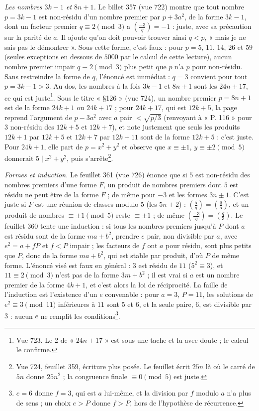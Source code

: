 \documentclass[11pt,a4paper]{article}
\begin{document}
\emph{Les nombres $3k-1$ et $8n+1$.} Le billet 357 (vue 722) montre que tout nombre $p=3k-1$ est non-résidu d'un nombre premier par $p+3a^2$, de la forme $3k-1$, dont un facteur premier $q\equiv 2\pmod 3$ a $\left(\frac{-3}{q}\right)=-1$ : juste, avec sa précaution sur la parité de $a$. Il ajoute qu'on doit pouvoir trouver ainsi $q<p$, « mais je ne sais pas le démontrer ». Sous cette forme, c'est faux : pour $p=5$, $11$, $14$, $26$ et $59$ (seules exceptions en dessous de $5000$ par le calcul de cette lecture), aucun nombre premier impair $q\equiv 2\pmod 3$ plus petit que $p$ n'a $p$ pour non-résidu. Sans restreindre la forme de $q$, l'énoncé est immédiat : $q=3$ convient pour tout $p=3k-1>3$. Au dos, les nombres à la fois $3k-1$ et $8n+1$ sont les $24n+17$, ce qui est juste\footnote{Vue 723. Le 2 de « $24n+17$ » est sous une tache et lu avec doute ; le calcul le confirme.}. Sous le titre « §126 » (vue 724), un nombre premier $p=8n+1$ est de la forme $24k+1$ ou $24k+17$ ; pour $24k+17$, qui est $12k+5$, la page reprend l'argument de $p-3a^2$ avec $a$ pair $<\sqrt{p/3}$ (renvoyant à « P. 116 » pour $3$ non-résidu des $12k+5$ et $12k+7$), et note justement que seuls les produits $12k+1$ par $12k+5$ et $12k+7$ par $12k+11$ sont de la forme $12k+5$ : c'est juste. Pour $24k+1$, elle part de $p=x^2+y^2$ et observe que $x\equiv\pm1$, $y\equiv\pm2\pmod 5$ donnerait $5\mid x^2+y^2$, puis s'arrête\footnote{Vue 724, feuillet 359, écriture plus posée. Le feuillet écrit $25n$ là où le carré de $5n$ donne $25n^2$ ; la congruence finale $\equiv 0\pmod 5$ est juste.}.

\emph{Formes et induction.} Le feuillet 361 (vue 726) énonce que si $5$ est non-résidu des nombres premiers d'une forme $F$, un produit de nombres premiers dont $5$ est résidu ne peut être de la forme $F$ ; de même pour $-3$ et les formes $3n\pm1$. C'est juste si $F$ est une réunion de classes modulo $5$ (les $5n\pm2$) : $\left(\frac{5}{q}\right)=\left(\frac{q}{5}\right)$, et un produit de nombres $\equiv\pm1\pmod 5$ reste $\equiv\pm1$ ; de même $\left(\frac{-3}{q}\right)=\left(\frac{q}{3}\right)$. Le feuillet 360 tente une induction : si tous les nombres premiers jusqu'à $P$ dont $a$ est résidu sont de la forme $ma+b^2$, prendre $e$ pair, non divisible par $a$, avec $e^2=a+fP$ et $f<P$ impair ; les facteurs de $f$ ont $a$ pour résidu, sont plus petits que $P$, donc de la forme $ma+b^2$, qui est stable par produit, d'où $P$ de même forme. L'énoncé visé est faux en général : $3$ est résidu de $11$ ($5^2\equiv 3$), et $11\equiv 2\pmod 3$ n'est pas de la forme $3m+b^2$ ; il est vrai si $a$ est un nombre premier de la forme $4k+1$, et c'est alors la loi de réciprocité. La faille de l'induction est l'existence d'un $e$ convenable : pour $a=3$, $P=11$, les solutions de $e^2\equiv 3\pmod{11}$ inférieures à $11$ sont $5$ et $6$, et la seule paire, $6$, est divisible par $3$ : aucun $e$ ne remplit les conditions\footnote{$e=6$ donne $f=3$, qui est $a$ lui-même, et la division par $f$ modulo $a$ n'a plus de sens ; un choix $e>P$ donne $f>P$, hors de l'hypothèse de récurrence.}.
\end{document}

